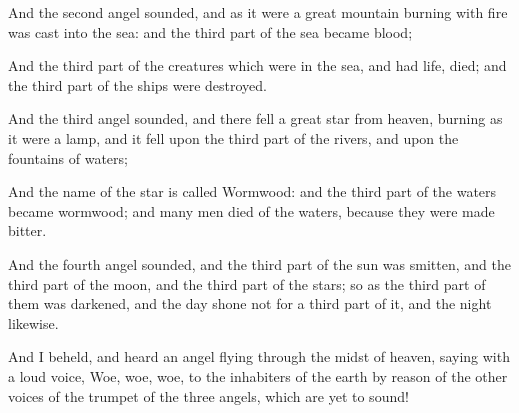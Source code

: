 {And the
second
angel
sounded,
and as it
were a
great
mountain
burning with
fire was
cast
into the
sea:
and the third
part of the
sea
became
blood;

And the third
part of the
creatures which
were
in the
sea, and
had
life,
died;
and the third
part of the
ships were
destroyed.

And the
third
angel
sounded,
and there
fell a
great
star
from
heaven,
burning as it
were a
lamp,
and it
fell
upon the third
part of the
rivers,
and
upon the
fountains of
waters;

And the
name of the
star is
called
Wormwood:
and the
third part of the
waters
became
wormwood;
and
many
men
died
of the waters,
because they were made
bitter.

And the
fourth
angel
sounded,
and the third
part of the
sun was
smitten,
and the third
part of the
moon,
and the third
part of the
stars; so
as the third
part of
them was
darkened,
and the
day
shone
not for a third
part of
it,
and the
night
likewise.

And I
beheld,
and
heard
an
angel
flying through the midst of
heaven,
saying
with a
loud
voice,
Woe,
woe,
woe, to
the
inhabiters
of the
earth by
reason of the
other
voices of the
trumpet of the
three
angels, which are
yet to
sound!




\par }
